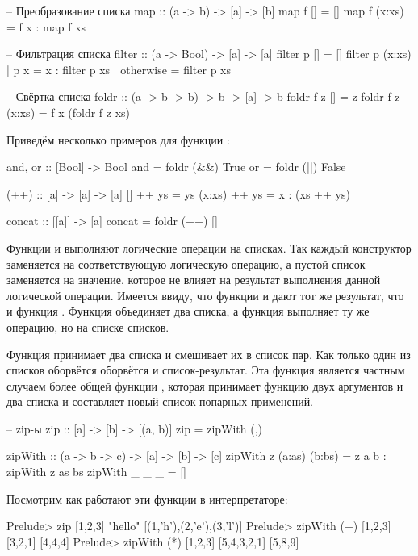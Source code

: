 \begin{code}
-- Преобразование списка
map :: (a -> b) -> [a] -> [b]
map f []     = []
map f (x:xs) = f x : map f xs

-- Фильтрация списка
filter :: (a -> Bool) -> [a] -> [a]
filter p []                 = []
filter p (x:xs) | p x       = x : filter p xs
                | otherwise = filter p xs

-- Свёртка списка
foldr            :: (a -> b -> b) -> b -> [a] -> b
foldr f z []     =  z
foldr f z (x:xs) =  f x (foldr f z xs)
\end{code}

Приведём несколько примеров для функции :

\begin{code}
and, or :: [Bool] -> Bool
and = foldr (&&) True
or  = foldr (||) False

(++) :: [a] -> [a] -> [a]
[]     ++ ys = ys
(x:xs) ++ ys = x : (xs ++ ys)
    
concat :: [[a]] -> [a]
concat = foldr (++) []
\end{code}

Функции  и  выполняют логические операции 
на списках. Так каждый конструктор \In{(:)} заменяется на 
соответствующую логическую операцию, а пустой список заменяется
на значение, которое не влияет на результат выполнения 
данной логической операции. Имеется ввиду, что функции
 и  дают тот же результат,
что и функция . 
Функция \In{(++)} объединяет два списка, а функция 
выполняет ту же операцию, но на списке списков.

Функция  принимает два списка и смешивает
их в список пар. Как только один из списков оборвётся 
оборвётся и список-результат. Эта функция является
частным случаем более общей функции ,
которая принимает функцию двух аргументов и два списка
и составляет новый список попарных применений.

\begin{code}
-- zip-ы 
zip :: [a] -> [b] -> [(a, b)]
zip = zipWith (,)

zipWith :: (a -> b -> c) -> [a] -> [b] -> [c]
zipWith z (a:as) (b:bs) =  z a b : zipWith z as bs
zipWith _ _ _           =  []
\end{code}

Посмотрим как работают эти функции в интерпретаторе:

\begin{code}
Prelude> zip [1,2,3] "hello"
[(1,'h'),(2,'e'),(3,'l')]
Prelude> zipWith (+) [1,2,3] [3,2,1]
[4,4,4]
Prelude> zipWith (*) [1,2,3] [5,4,3,2,1]
[5,8,9]
\end{code}

